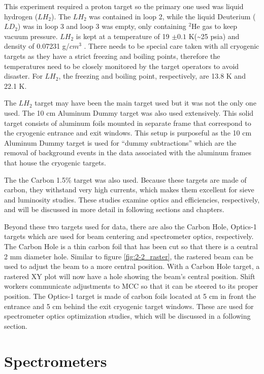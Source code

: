 \documentclass[
]{report}
\begin{document}
This experiment required a proton target so the primary one used was
liquid hydrogen (\(LH_2\)). The \(LH_2\) was contained in loop 2, while
the liquid Deuterium (\(LD_2\)) was in loop 3 and loop 3 was empty, only
containing \(^{2}\mathrm{He}\) gas to keep vacuum pressure. \(LH_2\) is
kept at a temperature of 19 \(\pm 0.1\) K(\textasciitilde25 psia) and
density of 0.07231 g/\(cm^3\) \cite{smith_g_hall_2016}. There needs to
be special care taken with all cryogenic targets as they have a strict
freezing and boiling points, therefore the temperatures need to be
closely monitored by the target operators to avoid disaster. For
\(LH_2\), the freezing and boiling point, respectively, are 13.8 K and
22.1 K.

The \(LH_2\) target may have been the main target used but it was not
the only one used. The 10 cm Aluminum Dummy target was also used
extensively. This solid target consists of aluminum foils mounted in
separate frame that correspond to the cryogenic entrance and exit
windows. This setup is purposeful as the 10 cm Aluminum Dummy target is
used for ``dummy subtractions'' which are the removal of background
events in the data associated with the aluminum frames that house the
cryogenic targets.

The the Carbon 1.5\% target was also used. Because these targets are
made of carbon, they withstand very high currents, which makes them
excellent for sieve and luminosity studies. These studies examine optics
and efficiencies, respectively, and will be discussed in more detail in
following sections and chapters.

Beyond these two targets used for data, there are also the Carbon Hole,
Optics-1 targets which are used for beam centering and spectrometer
optics, respectively. The Carbon Hole is a thin carbon foil that has
been cut so that there is a central 2 mm diameter hole. Similar to
figure \ref{fig:2-2_raster}, the rastered beam can be used to adjust the
beam to a more central position. With a Carbon Hole target, a rastered
XY plot will now have a hole showing the beam's central position. Shift
workers communicate adjustments to MCC so that it can be steered to its
proper position. The Optics-1 target is made of carbon foils located at
5 cm in front the entrance and 5 cm behind the exit cryogenic target
windows. These are used for spectrometer optics optimization studies,
which will be discussed in a following section.

\hypertarget{Section-4.5}{%
\section{Spectrometers}\label{Section-4.5}}
\end{document}
